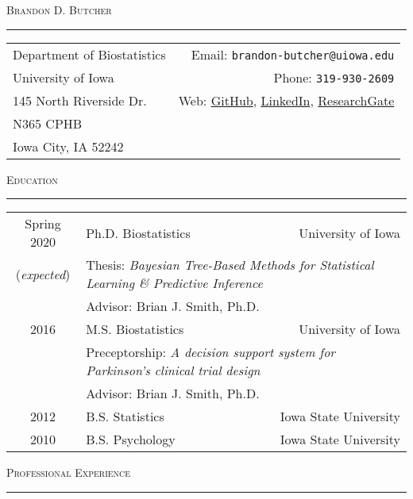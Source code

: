 \documentclass[a4paper]{article}
\newcommand{\LinkedIn}{\href{https://www.linkedin.com/in/brandon-butcher-72250153/}{LinkedIn}}
\newcommand{\ResearchGate}{\href{https://www.researchgate.net/profile/Brandon_Butcher}{ResearchGate}}
\newcommand{\GitHub}{\href{https://github.com/brandondbutcher}{GitHub}}
\begin{document}
\begin{center}
  \Huge\textsc{Brandon D. Butcher}
  \textcolor{usafagrey}{\rule{\textwidth}{1pt}}
\end{center}


\begin{tabular*}{0.95\textwidth}{@{\extracolsep{\fill}}lr}
  Department of Biostatistics & Email: \texttt{brandon-butcher@uiowa.edu} \\
  University of Iowa & Phone: \texttt{319-930-2609} \\
  145 North Riverside Dr.  & Web: \GitHub, \LinkedIn, \ResearchGate \\
  N365 CPHB & \\
  Iowa City, IA 52242 &  \\
\end{tabular*}
\vspace{\baselineskip}


\begin{flushleft}
  \Large\textsc{Education}
  \textcolor{usafagrey}{\rule[0.5\baselineskip]{\textwidth}{0.75pt}}
\end{flushleft}
\vspace{-\baselineskip}

\begin{tabular*}{0.96\textwidth}{@{\extracolsep{\fill}}clr}
  Spring 2020 & Ph.D. Biostatistics & University of Iowa \\
 (\textit{expected}) & \multicolumn{2}{l}{Thesis: \textit{Bayesian Tree-Based Methods for
      Statistical Learning \& Predictive Inference}} \\
   & Advisor: Brian J. Smith, Ph.D. & \\[3pt]
  2016 & M.S. Biostatistics & University of Iowa \\
   & \multicolumn{2}{l}{
    Preceptorship: \textit{
      A decision support system for Parkinson's clinical trial design
   }} \\
   & Advisor: Brian J. Smith, Ph.D. & \\[3pt]
  2012 & B.S. Statistics & Iowa State University \\
  2010 & B.S. Psychology & Iowa State University
\end{tabular*}
\vspace{0.25\baselineskip}


\begin{flushleft}
  \Large\textsc{Professional Experience}
  \textcolor{usafagrey}{\rule[0.5\baselineskip]{\textwidth}{0.75pt}}
\end{flushleft}
\vspace{-\baselineskip}
\end{document}
